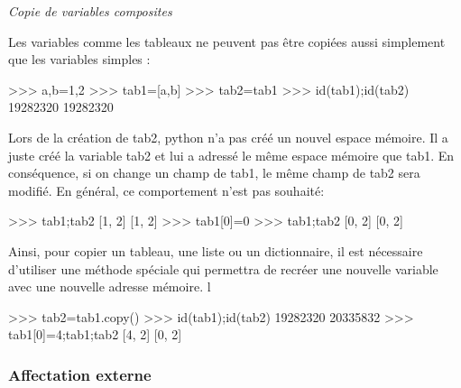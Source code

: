 \documentclass[11pt,oneside]{article}
\begin{document}
\begin{exemple}
\textit{Copie de variables composites}

Les variables comme les tableaux ne peuvent pas être copiées aussi simplement que les variables simples :


\begin{minipage}[c]{.55\linewidth}
\begin{py}
\begin{python}
>>> a,b=1,2
>>> tab1=[a,b]
>>> tab2=tab1
>>> id(tab1);id(tab2)
    19282320
    19282320
\end{python}
\end{py}
\end{minipage}

Lors de la création de tab2, python n'a pas créé un nouvel espace mémoire. Il a juste créé la variable tab2 et lui a adressé le même espace mémoire que tab1. En conséquence, si on change un champ de tab1, le même champ de tab2 sera modifié. En général, ce comportement n'est pas souhaité:

\begin{minipage}[c]{.55\linewidth}
\begin{py}
\begin{python}
>>> tab1;tab2
    [1, 2]
    [1, 2]
>>> tab1[0]=0
>>> tab1;tab2
    [0, 2]
    [0, 2]
\end{python}
\end{py}
\end{minipage}

Ainsi, pour copier un tableau, une liste ou un dictionnaire, il est nécessaire d'utiliser une méthode spéciale qui permettra de recréer une nouvelle variable avec une nouvelle adresse mémoire.
l
\begin{minipage}[c]{.55\linewidth}
\begin{py}
\begin{python}
>>> tab2=tab1.copy()
>>> id(tab1);id(tab2)
    19282320
    20335832
>>> tab1[0]=4;tab1;tab2
    [4, 2]
    [0, 2]
\end{python}
\end{py}
\end{minipage}\hfill
\begin{minipage}[c]{.3\linewidth}
\end{minipage}

\end{exemple}


\subsubsection{Affectation externe}
\end{document}

